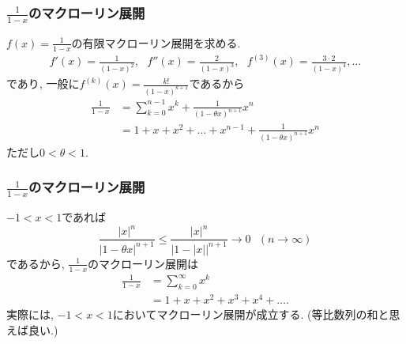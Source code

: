 %
%





\begin{frame}
\frametitle{$\frac{1}{1-x}$のマクローリン展開}

$f(x)=\frac{1}{1-x}$の有限マクローリン展開を求める. 
\begin{align*}
f'(x)=\frac{1}{(1-x)^2}, \ \ \ f''(x)=\frac{2}{(1-x)^3}, \ \ \  f^{(3)}(x)=\frac{3\cdot 2}{(1-x)^4}, \dots 
\end{align*}
であり, 一般に$f^{(k)}(x)=\frac{k!}{(1-x)^{k+1}}$であるから
\begin{align*}
\frac{1}{1-x} & = \sum_{k=0}^{n-1}x^k+\frac{1}{(1-\theta x)^{n+1}}x^n \\
& = 1+x+x^2+\dots+x^{n-1}+\frac{1}{(1-\theta x)^{n+1}}x^n
\end{align*}
ただし$0<\theta < 1$. 

\end{frame}




\begin{frame}
\frametitle{$\frac{1}{1-x}$のマクローリン展開}

$-1 < x < 1$であれば
$$
\frac{|x|^n}{|1-\theta x|^{n+1}} \le \frac{|x|^n}{|1-|x||^{n+1}} \to 0 \ \ \ (n\to \infty)
$$
であるから, $\frac{1}{1-x}$のマクローリン展開は
\begin{align*}
\frac{1}{1-x} & = \sum_{k=0}^{\infty} x^k \\
&=1+x+x^2+x^3+x^4+\dots. 
\end{align*}
実際には, $-1<x<1$においてマクローリン展開が成立する. 
(等比数列の和と思えば良い.)

\end{frame}




